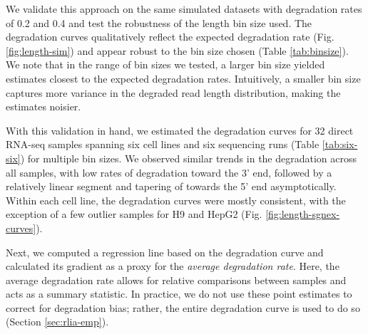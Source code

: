 \begin{table}[H]
  \centering
  \caption[Degradation estimates on simulated datasets based on read length distribution]{Degradation estimates on simulated datasets based on read length distribution. The length bin size is varied for 100, 200 and 500 bp, and the average degradation rate is computed.}
  \label{tab:binsize}%
\end{table}%

We validate this approach on the same simulated datasets with degradation rates of 0.2 and 0.4 and test the robustness of the length bin size used. The degradation curves qualitatively reflect the expected degradation rate (Fig. \ref{fig:length-sim}) and appear robust to the bin size chosen (Table \ref{tab:binsize}). We note that in the range of bin sizes we tested, a larger bin size yielded estimates closest to the expected degradation rates. Intuitively, a smaller bin size captures more variance in the degraded read length distribution, making the estimates noisier.         

With this validation in hand, we estimated the degradation curves for 32 direct RNA-seq samples spanning six cell lines and six sequencing runs (Table \ref{tab:six-six}) for multiple bin sizes. We observed similar trends in the degradation across all samples, with low rates of degradation toward the 3' end, followed by a relatively linear segment and tapering of towards the 5' end asymptotically. Within each cell line, the degradation curves were mostly consistent, with the exception of a few outlier samples for H9 and HepG2 (Fig. \ref{fig:length-sgnex-curves}).  

Next, we computed a regression line based on the degradation curve and calculated its gradient as a proxy for the \textit{average degradation rate}. Here, the average degradation rate allows for relative comparisons between samples and acts as a summary statistic. In practice, we do not use these point estimates to correct for degradation bias; rather, the entire degradation curve is used to do so (Section \ref{sec:rlia-emp}).   

